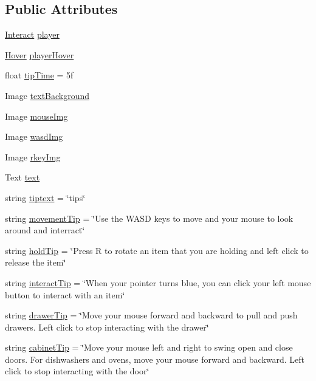 \subsection*{Public Attributes}
\begin{DoxyCompactItemize}
\item 
\hyperlink{class_interact}{Interact} \hyperlink{class_tips_screen_aa33ecd5d27044d26989062528e6144ae}{player}
\item 
\hyperlink{class_hover}{Hover} \hyperlink{class_tips_screen_a9cc3e3103e8fa85c222b830e9a920656}{player\+Hover}
\item 
float \hyperlink{class_tips_screen_a094d8fcfc3c0792b93f8ff1f659e9e4c}{tip\+Time} = 5f
\item 
Image \hyperlink{class_tips_screen_a58eadd733c11628346dc9b66bfb1a84f}{text\+Background}
\item 
Image \hyperlink{class_tips_screen_ad27413bf25688e59257c10ada92595d4}{mouse\+Img}
\item 
Image \hyperlink{class_tips_screen_a47cc9cb69733eeffe9c89abebbb30f11}{wasd\+Img}
\item 
Image \hyperlink{class_tips_screen_ad6fc9027e3f70f5e28796792c777f05a}{rkey\+Img}
\item 
Text \hyperlink{class_tips_screen_a1625c940af5062c65c32d54948f7d69d}{text}
\item 
string \hyperlink{class_tips_screen_afebeb53f0de64792e7b5f068fb28b543}{tiptext} = \char`\"{}tips\char`\"{}
\item 
string \hyperlink{class_tips_screen_a1df49222f7810e35b1b0c89272dee578}{movement\+Tip} = \char`\"{}Use the W\+A\+SD keys to move and your mouse to look around and interract\char`\"{}
\item 
string \hyperlink{class_tips_screen_acda577db9e1574d36cd2e67cc4de8a8b}{hold\+Tip} = \char`\"{}Press R to rotate an item that you are holding and left click to release the item\char`\"{}
\item 
string \hyperlink{class_tips_screen_a63461a193396734efb0225bb199f2bc6}{interact\+Tip} = \char`\"{}When your pointer turns blue, you can click your left mouse button to interact with an item\char`\"{}
\item 
string \hyperlink{class_tips_screen_a84464fc0906a6a565443db1f4cf77fc1}{drawer\+Tip} = \char`\"{}Move your mouse forward and backward to pull and push drawers. Left click to stop interacting with the drawer\char`\"{}
\item 
string \hyperlink{class_tips_screen_ad0621dd37d10219c82df9fc0e01ca831}{cabinet\+Tip} = \char`\"{}Move your mouse left and right to swing open and close doors. For dishwashers and ovens, move your mouse forward and backward. Left click to stop interacting with the door\char`\"{}
\end{DoxyCompactItemize}


